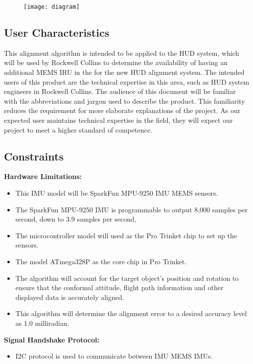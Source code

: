 \begin{figure}[!ht]
  \centering
      \texttt{[image: diagram]}
\end{figure}


\subsection{User Characteristics}
This alignment algorithm is intended to be applied to the HUD system, which will be used by Rockwell Collins to determine the availability of having an additional MEMS IRU in the for the new HUD alignment system. The intended users of this product are the technical expertise in this area, such as HUD system engineers in Rockwell Collins. The audience of this document will be familiar with the abbreviations and jargon used to describe the product. This familiarity reduces the requirement for more elaborate explanations of the project. As our expected user maintains technical expertise in the field, they will expect our project to meet a higher standard of competence.


\subsection{Constraints}
\textbf{Hardware Limitations:} 
\begin{itemize}
	\item 
	This IMU model will be SparkFun MPU-9250 IMU MEMS sensors. 
	\item 
	The SparkFun MPU-9250 IMU is programmable to output 8,000 samples per second, down to 3.9 samples per second,
	\item 
	The microcontroller model will used as the Pro Trinket chip to set up the sensors.   
	\item 
	The model ATmega328P as the core chip in Pro Trinket. 
	\item 
	The algorithm will account for the target object’s position and rotation to ensure that the conformal attitude, flight path information and other displayed data is accurately aligned.
	\item 
	This algorithm will determine the alignment error to a desired accuracy level as 1.0 milliradian.
	\\
\end{itemize}

\textbf{Signal Handshake Protocol:}
\begin{itemize}
	\item 
	I2C protocol is used to communicate between IMU MEMS IMUs.
	\\
\end{itemize}

